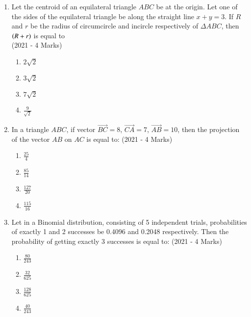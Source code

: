 \documentclass[journal]{IEEEtran}
\begin{document}
\begin{enumerate}
{		}
    \item{
            Let the centroid of an equilateral triangle $ABC$ be at the origin. Let one of the sides of the equilateral triangle be along the straight line $x + y = 3$. If $R$ and $r$ be the radius of circumcircle and incircle respectively of $\Delta ABC$, then $\left(R + r\right)$ is equal to\\ \text{ }
             \hfill
                {(2021 - 4 Marks)}
            \begin{multicols}{4}
                \begin{enumerate}
                    \item $2\sqrt{2}$    
                    \item $3\sqrt{2}$    
                    \item $7\sqrt{2}$    
                    \item $\frac{9}{\sqrt{2}}$
                \end{enumerate}
            \end{multicols}

        
        }
    \item{
            In a triangle $ABC$, if vector $\overrightarrow{BC} = 8$, $\overrightarrow{CA} = 7$, $\overrightarrow{AB} = 10$, then the projection of the vector $AB$ on $AC$ is equal to:
             \hfill
                {(2021 - 4 Marks)}
            \begin{multicols}{4}
                \begin{enumerate}
                	\item $\frac{25}{4}$ 
                	\item $\frac{85}{14}$ 
                	\item $\frac{127}{20}$ 
                	\item $\frac{115}{16}$
                \end{enumerate}
            \end{multicols}
        
        }
    \item{
            Let in a Binomial distribution, consisting of 5 independent trials, probabilities of exactly 1 and 2 successes be 0.4096 and 0.2048 respectively. Then the probability of getting exactly 3 successes is equal to:
             \hfill
                {(2021 - 4 Marks)}
			\begin{multicols}{4}
				\begin{enumerate}
					\item $\frac{80}{243}$
					\item $\frac{32}{625}$
					\item $\frac{128}{625}$
					\item $\frac{40}{243}$
				\end{enumerate}
			\end{multicols}
        
}
\end{enumerate}
\end{document}
